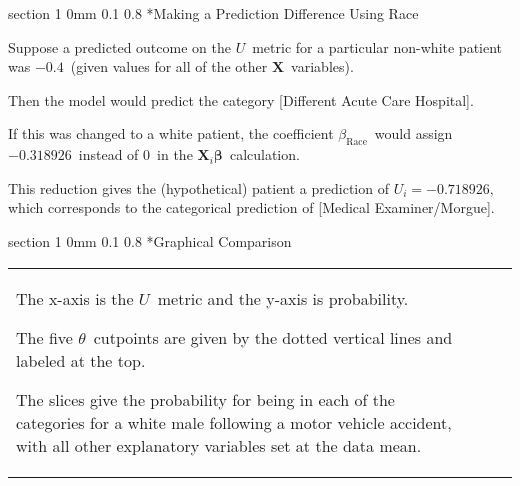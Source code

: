\documentclass[12pt]{article}
\makeatletter
\newcommand{\9}{\\[9pt]}
\newcommand{\bgm}{\color{MyMath}}
\newcommand{\egm}{\color{white}}
\renewcommand{\section}{\@startsection
	    {section}%
	    {1}%
	    {0mm}%
	    {0.1\baselineskip}%
	    {0.8\baselineskip}%
	    {\newpage \color[cmyk]{0.43,0,0.01,0} \center\LARGE}}%
\makeatother
\begin{document}
\begin{landscape}
\begin{Large}
{\section*{Making a Prediction Difference Using Race}
\begin{ohlist}
    \item   Suppose a predicted outcome on the \bgm$U$\egm\ metric for a particular non-white patient was \bgm$-0.4$\egm\ 
            (given values for all of the other \bgm$\mathbf{X}$\egm\ variables).  
    \item   Then the model would predict the category [Different Acute Care Hospital].  
    \item   If this was changed to a white patient, the coefficient \bgm$\beta_{\text{Race}}$\egm\ would assign \bgm$-0.318926$\egm\ 
            instead of \bgm$0$\egm\ in the \bgm$\mathbf{X}_i\boldsymbol{\beta}$\egm\ calculation.  
    \item   This reduction gives the (hypothetical) patient a prediction of \bgm$U_i = -0.718926$\egm, which corresponds to 
            the categorical prediction of [Medical Examiner/Morgue].
\end{ohlist}

\section*{Graphical Comparison}
\begin{tabular}{lcr}
\parbox{0.25\linewidth}{
    \begin{ohlist}
        \item   The x-axis is the \bgm$U$\egm\ metric and the y-axis is probability.  
        \item   The five \bgm$\theta$\egm\ cutpoints are given by the dotted vertical lines and labeled at the top. 
        \item   The slices give the probability for being in each of the categories for a white male following 
                a motor vehicle accident, with all other explanatory variables set at the data mean.
    \end{ohlist}
}
& $\quad$ &
\hspace{-0.5in}
\parbox{0.69\linewidth}{
}
\end{tabular}

\begin{comment}

\end{comment}}
\end{Large}
\end{landscape}
\end{document}
